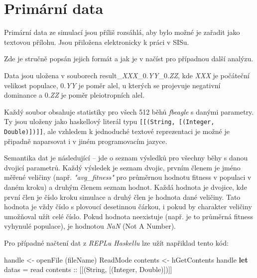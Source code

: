 \section{Primární data}
\label{sec:primarydata}

Primární data ze simulací jsou příliš rozsáhlá, aby bylo možné je zařadit jako textovou přílohu. Jsou přiložena elektronicky k práci v SISu.

Zde je stručně popsán jejich formát a jak je v načíst pro případnou další analýzu.

Data jsou uložena v souborech result\_\textit{XXX}\_0.\textit{YY}\_0.\textit{ZZ}, kde
\textit{XXX} je počáteční velikost populace,
0.\textit{YY} je poměr alel, u kterých se projevuje negativní dominance
a 0.\textit{ZZ} je poměr pleiotropních alel.

Každý soubor obsahuje statistiky pro všech 512 běhů \textit{fbeagle} s danými parametry. Ty jsou uloženy jako
haskellový literál typu \texttt{[[(String, [(Integer, Double)])]]}, ale vzhledem k jednoduché textové
reprezentaci je možné je připadně naparsovat i v jiném programovacím jazyce.

Semantika dat je následující -- jde o seznam výsledků pro všechny běhy s danou dvojicí parametrů. Každý výsledek
je seznam dvojic, prvním členem je jméno měřené veličiny (např. \textit{"avg\_fitness"} pro průměrnou hodnotu
fitness v populaci v daném kroku) a druhým členem seznam hodnot. Každá hodnota je dvojice, kde první člen je
číslo kroku simulace a druhý člen je hodnota dané veličiny. Tato hodnota je vždy číslo s plovoucí desetinnou čárkou,
i pokud by charakter veličiny umožňoval užít celé číslo. Pokud hodnota neexistuje (např. je to průměrná fitness vyhynulé
populace), je hodnotou \textit{NaN} (Not A Number).

Pro případné načtení dat z \textit{REPLu Haskellu} lze užít napřiklad tento kód:

\begin{code}[commandchars=\\\{\}]
handle <- openFile (fileName) ReadMode
contents <- hGetContents handle
\textbf{let}
        datas = read contents :: [[(String, [(Integer, Double)])]]
\end{code}
